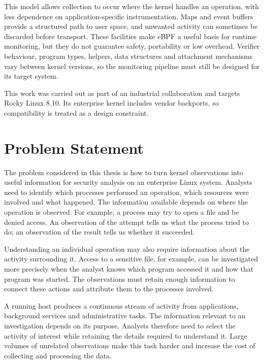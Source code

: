 This model allows collection to occur where the kernel handles an operation, with less dependence on application-specific instrumentation. Maps and event buffers provide a structured path to user space, and unwanted activity can sometimes be discarded before transport. These facilities make eBPF a useful basis for runtime monitoring, but they do not guarantee safety, portability or low overhead. Verifier behaviour, program types, helpers, data structures and attachment mechanisms vary between kernel versions, so the monitoring pipeline must still be designed for its target system.

This work was carried out as part of an industrial collaboration and targets
Rocky Linux 8.10. Its enterprise kernel includes vendor backports, so
compatibility is treated as a design constraint\cite{redhat2025backporting}.

\section{Problem Statement}
  \label{sec:introduction-problem-statement}

  The problem considered in this thesis is how to turn kernel observations
  into useful information for security analysis on an enterprise Linux system.
  Analysts need to identify which processes performed an operation, which
  resources were involved and what happened. The information available depends
  on where the operation is observed. For example, a process may try to open
  a file and be denied access. An observation of the attempt tells us what the
  process tried to do; an observation of the result tells us whether it
  succeeded.

  Understanding an individual operation may also require information about
  the activity surrounding it. Access to a sensitive file, for example, can
  be investigated more precisely when the analyst knows which program accessed
  it and how that program was started. The observations must retain enough
  information to connect these actions and attribute them to the processes
  involved.

  A running host produces a continuous stream of activity from applications,
  background services and administrative tasks. The information relevant to
  an investigation depends on its purpose. Analysts therefore need to select
  the activity of interest while retaining the details required to understand
  it. Large volumes of unrelated observations make this task harder and
  increase the cost of collecting and processing the data.

